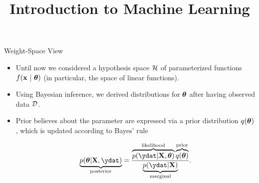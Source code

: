 




\newcommand{\titlefigure}{figure_man/discrete/marginalization-more.png} %
\newcommand{\learninggoals}{
  \item GPs model distributions over a function space
  \item Know the marginalization property
  \item Know that a GP is fully specified by a mean and a covariance function 
  \item Know how to sample from a GP
  \item Know GPs as indexed families
}

\title{Introduction to Machine Learning}
\date{}





\begin{vbframe}{Weight-Space View}

\begin{itemize}
  \item Until now we considered a hypothesis space $\mathcal{H}$ of parameterized functions $f(\mathbf{x} ~|~ \bm{\theta})$ (in particular, the space of linear functions). 
  \item Using Bayesian inference, we derived distributions for $\bm{\theta}$ after having observed data $\mathcal{D}$. 
  \item Prior believes about the parameter are expressed via a prior distribution $q(\bm{\theta})$, which is updated according to Bayes' rule 

  $$
  \underbrace{p(\thetab | \Xmat, \ydat)}_{\text{posterior}} = \frac{\overbrace{p(\ydat | \Xmat, \thetab)}^{\text{likelihood}}\overbrace{q(\thetab)}^{\text{prior}}}{\underbrace{p(\ydat|\Xmat)}_{\text{marginal}}}. 
  $$
\end{itemize}

\end{vbframe}


